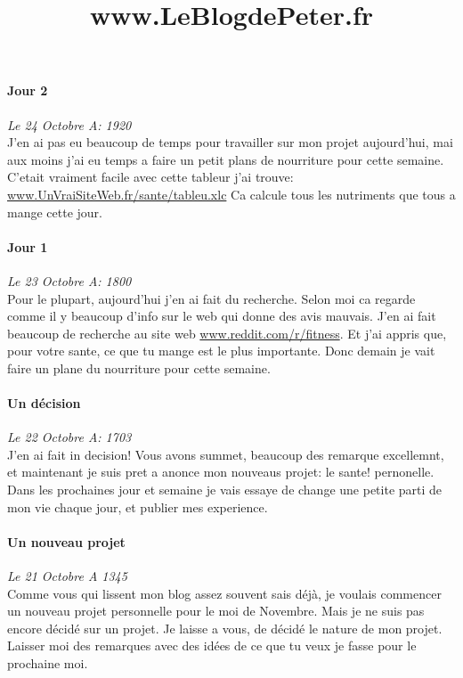 \documentclass{article}
\begin{document}
\title{www.LeBlogdePeter.fr}

\paragraph{Jour 2} \emph{Le 24 Octobre A: 1920}\\
J'en ai pas eu beaucoup de temps pour travailler sur mon projet aujourd'hui, mai aux moins j'ai eu temps a faire un petit plans de nourriture
pour cette semaine. C'etait vraiment facile avec cette tableur j'ai trouve: \underline{www.UnVraiSiteWeb.fr/sante/tableu.xlc} Ca calcule 
tous les nutriments que tous a mange cette jour.

\paragraph{Jour 1} \emph{Le 23 Octobre A: 1800}\\
Pour le plupart, aujourd'hui j'en ai fait du recherche. Selon moi ca regarde comme il y beaucoup d'info sur le web qui donne des avis mauvais.
J'en ai fait beaucoup de recherche au site web \underline{www.reddit.com/r/fitness}. Et j'ai appris que, pour votre sante, ce que tu mange est
le plus importante. Donc demain je vait faire un plane du nourriture pour cette semaine.

\paragraph{Un décision} \emph{Le 22 Octobre A: 1703}\\
J'en ai fait in decision!  Vous avons summet, beaucoup des remarque excellemnt, et maintenant je suis pret a anonce mon nouveaus projet: le sante!  pernonelle. Dans les prochaines jour et semaine je vais essaye de change une petite parti de mon vie chaque jour, et publier mes experience.

\paragraph{Un nouveau projet} \emph{Le 21 Octobre A 1345} \\
Comme vous qui lissent mon blog assez souvent sais déjà, je voulais commencer un nouveau projet personnelle pour le moi de Novembre. Mais je ne suis pas encore décidé sur un projet. Je laisse a vous, de décidé le nature de mon projet. Laisser moi des remarques avec des idées de ce que tu veux je fasse pour le prochaine moi.
\end{document}
